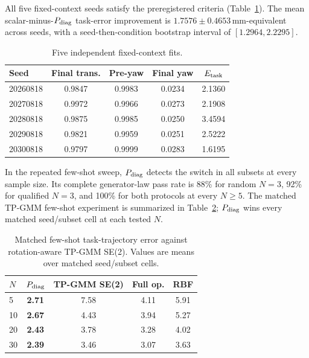 \documentclass[letterpaper,10pt,conference]{ieeeconf}
\begin{document}
All five fixed-context seeds satisfy the preregistered criteria
(Table~\ref{tab:multiseed}). The mean scalar-minus-$P_{\rm diag}$ task-error
improvement is $1.7576\pm0.4653$\,mm-equivalent across seeds, with a
seed-then-condition bootstrap interval of $[1.2964,2.2295]$.

\begin{table}[t]
\centering
\caption{Five independent fixed-context fits.}
\label{tab:multiseed}
\small
\setlength{\tabcolsep}{3.5pt}
\begin{tabular}{lcccc}
\toprule
Seed & Final trans. & Pre-yaw & Final yaw & $E_{\rm task}$\\
\midrule
20260818 & 0.9847 & 0.9983 & 0.0234 & 2.1360\\
20270818 & 0.9972 & 0.9966 & 0.0273 & 2.1908\\
20280818 & 0.9875 & 0.9985 & 0.0250 & 3.4594\\
20290818 & 0.9821 & 0.9959 & 0.0251 & 2.5222\\
20300818 & 0.9797 & 0.9999 & 0.0283 & 1.6195\\
\bottomrule
\end{tabular}
\end{table}

In the repeated few-shot sweep, $P_{\rm diag}$ detects the switch in all subsets
at every sample size. Its complete generator-law pass rate is 88\% for random
$N=3$, 92\% for qualified $N=3$, and 100\% for both protocols at every
$N\geq5$. The matched TP-GMM few-shot experiment is summarized in
Table~\ref{tab:fewshot_tpgmm}; $P_{\rm diag}$ wins every matched seed/subset
cell at each tested $N$.

\begin{table}[t]
\centering
\caption{Matched few-shot task-trajectory error against rotation-aware
TP-GMM SE(2). Values are means over matched seed/subset cells.}
\label{tab:fewshot_tpgmm}
\small
\setlength{\tabcolsep}{4.2pt}
\begin{tabular}{lcccc}
\toprule
$N$ & $P_{\rm diag}$ & TP-GMM SE(2) & Full op. & RBF\\
\midrule
5 & \textbf{2.71} & 7.58 & 4.11 & 5.91\\
10 & \textbf{2.67} & 4.43 & 3.94 & 5.27\\
20 & \textbf{2.43} & 3.78 & 3.28 & 4.02\\
30 & \textbf{2.39} & 3.46 & 3.07 & 3.63\\
\bottomrule
\end{tabular}
\end{table}
\end{document}
